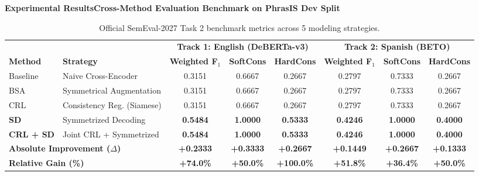 \documentclass[aspectratio=169,10pt]{beamer}
\begin{document}
\begin{frame}{\textbf{Experimental Results}}{\textbf{Cross-Method Evaluation Benchmark on PhrasIS Dev Split}}
  \small
  \begin{table}[h]
    \centering
    \small
    \begin{tabular}{ll ccc ccc}
      \toprule
      & & \multicolumn{3}{c}{\textbf{Track 1: English (DeBERTa-v3)}} & \multicolumn{3}{c}{\textbf{Track 2: Spanish (BETO)}} \\
      \cmidrule(lr){3-5} \cmidrule(lr){6-8}
      \textbf{Method} & \textbf{Strategy} & \textbf{Weighted F$_1$} & \textbf{SoftCons} & \textbf{HardCons} & \textbf{Weighted F$_1$} & \textbf{SoftCons} & \textbf{HardCons} \\
      \midrule
      Baseline & Naive Cross-Encoder & 0.3151 & 0.6667 & 0.2667 & 0.2797 & 0.7333 & 0.2667 \\
      BSA & Symmetrical Augmentation & 0.3151 & 0.6667 & 0.2667 & 0.2797 & 0.7333 & 0.2667 \\
      CRL & Consistency Reg. (Siamese) & 0.3151 & 0.6667 & 0.2667 & 0.2797 & 0.7333 & 0.2667 \\
      \rowcolor{TableHighlight}
      \textbf{SD} & Symmetrized Decoding & \textbf{0.5484} & \textbf{1.0000} & \textbf{0.5333} & \textbf{0.4246} & \textbf{1.0000} & \textbf{0.4000} \\
      \rowcolor{TableHighlight}
      \textbf{CRL + SD} & Joint CRL + Symmetrized & \textbf{0.5484} & \textbf{1.0000} & \textbf{0.5333} & \textbf{0.4246} & \textbf{1.0000} & \textbf{0.4000} \\
      \midrule
      \multicolumn{2}{l}{\textbf{Absolute Improvement ($\Delta$)}} & \textbf{+0.2333} & \textbf{+0.3333} & \textbf{+0.2667} & \textbf{+0.1449} & \textbf{+0.2667} & \textbf{+0.1333} \\
      \multicolumn{2}{l}{\textbf{Relative Gain (\%)}} & \textbf{+74.0\%} & \textbf{+50.0\%} & \textbf{+100.0\%} & \textbf{+51.8\%} & \textbf{+36.4\%} & \textbf{+50.0\%} \\
      \bottomrule
    \end{tabular}
    \caption{Official SemEval-2027 Task 2 benchmark metrics across 5 modeling strategies.}
  \end{table}


\end{frame}
\end{document}
